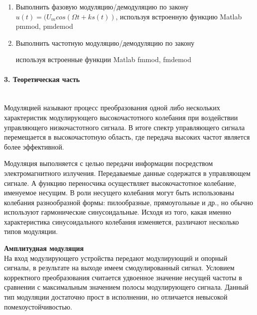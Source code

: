 \documentclass[12pt,a4paper]{report}
\begin{document}
\begin{enumerate}
\item Выполнить фазовую модуляцию/демодуляцию по закону $u(t)=(U_{m}cos({\Omega}t+ks(t)) $, используя встроенную функцию Matlab pmmod, pmdemod

\item Выполнить частотную модуляцию/демодуляцию по закону
	
\begin{figure}[h]
\end{figure}
используя встроенные функции Matlab fmmod, fmdemod

\end{enumerate}

\paragraph{3. Теоретическая часть \\\\}

Модуляцией называют процесс преобразования одной либо нескольких характеристик модулирующего высокочастотного колебания при воздействии управляющего низкочастотного сигнала. В итоге спектр управляющего сигнала перемещается в высокочастотную область, где передача высоких частот является более эффективной.

Модуляция выполняется с целью передачи информации посредством электромагнитного излучения. Передаваемые данные содержатся в управляющем сигнале. А функцию переносчика осуществляет высокочастотное колебание, именуемое несущим. В роли несущего колебания могут быть использованы колебания разнообразной формы: пилообразные, прямоугольные и др., но обычно используют гармонические синусоидальные. Исходя из того, какая именно характеристика синусоидального колебания изменяется, различают несколько типов модуляции.

\textbf{Амплитудная модуляция\\}
На вход модулирующего устройства передают модулирующий и опорный сигналы, в результате на выходе имеем смодулированный сигнал. Условием корректного преобразования считается удвоенное значение несущей частоты в сравнении с максимальным значением полосы модулирующего сигнала. Данный тип модуляции достаточно прост в исполнении, но отличается невысокой помехоустойчивостью.
\end{document}
